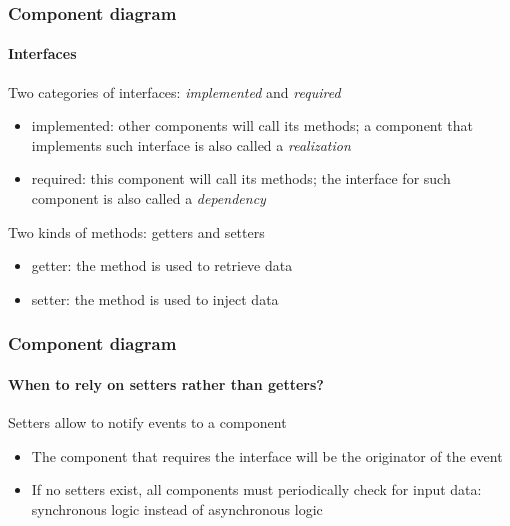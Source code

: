 \begin{frame}
\frametitle{Component diagram}
\framesubtitle{Interfaces}

\begin{block}{Two categories of interfaces: {\em implemented} and {\em required}}
\begin{itemize}
\item implemented: other components will call its methods; a component that implements such interface is also called a {\em realization}
\item required: this component will call its methods; the interface for such component is also called a {\em dependency}
\end{itemize}
\end{block}
\pause
\begin{block}{Two kinds of methods: getters and setters}
\begin{itemize}
\item getter: the method is used to retrieve data
\item setter: the method is used to inject data
\end{itemize}
\end{block}

\end{frame}

\begin{frame}
\frametitle{Component diagram}
\framesubtitle{When to rely on setters rather than getters?}

\begin{block}{Setters allow to notify events to a component}
\begin{itemize}
\item The component that requires the interface will be the originator of the event
\item If no setters exist, all components must periodically check for input data: synchronous logic instead of asynchronous logic
\end{itemize}
\end{block}

\end{frame}

